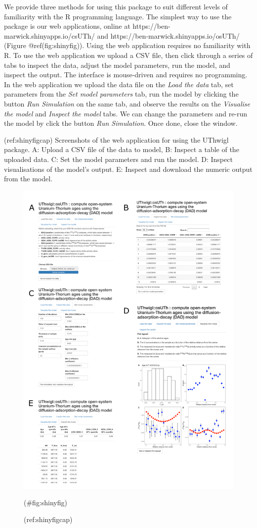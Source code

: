 \documentclass[]{elsarticle} %
\begin{document}
We provide three methods for using this package to suit different levels of familiarity with the R programming language. The simplest way to use the package is our web applications, online at https://ben-marwick.shinyapps.io/csUTh/ and https://ben-marwick.shinyapps.io/osUTh/ (Figure @ref(fig:shinyfig)). Using the web application requires no familiarity with R. To use the web application we upload a CSV file, then click through a series of tabs to inspect the data, adjust the model parameters, run the model, and inspect the output. The interface is mouse-driven and requires no programming. In the web application we upload the data file on the \emph{Load the data} tab, set parameters from the \emph{Set model parameters} tab, run the model by clicking the button \emph{Run Simulation} on the same tab, and observe the results on the \emph{Visualise the model} and \emph{Inspect the model} tabs. We can change the parameters and re-run the model by click the button \emph{Run Simulation}. Once done, close the window.

(ref:shinyfigcap) Screenshots of the web application for using the UThwigl package. A: Upload a CSV file of the data to model, B: Inspect a table of the uploaded data. C: Set the model parameters and run the model. D: Inspect visualisations of the model's output. E: Inspect and download the numeric output from the model.

\begin{figure}
\includegraphics[width=0.95\linewidth]{figures/shiny-app-screenshots} \caption{(ref:shinyfigcap)}(\#fig:shinyfig)
\end{figure}
\end{document}
